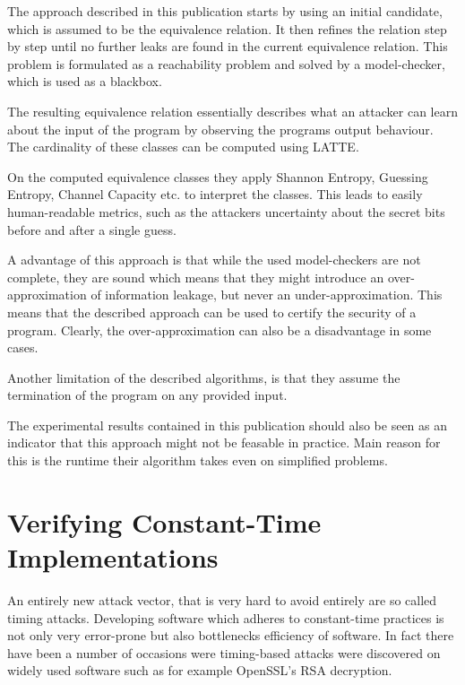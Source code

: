 \documentclass[a4paper,UKenglish]{lipics-v2018}
\begin{document}
The approach described in this publication starts by using an initial candidate, which is assumed to be the equivalence relation. It then refines the relation step by step until no further leaks are found in the current equivalence relation. This problem is formulated as a reachability problem and solved by a model-checker, which is used as a blackbox.\cite{automatic_discovery_and_quantification}

The resulting equivalence relation essentially describes what an attacker can learn about the input of the program by observing the programs output behaviour. The cardinality of these classes can be computed using LATTE.\cite{automatic_discovery_and_quantification}

On the computed equivalence classes they apply Shannon Entropy, Guessing Entropy, Channel Capacity etc. to interpret the classes. This leads to easily human-readable metrics, such as the attackers uncertainty about the secret bits before and after a single guess.\cite{automatic_discovery_and_quantification}

A advantage of this approach is that while the used model-checkers are not complete, they are sound which means that they might introduce an over-approximation of information leakage, but never an under-approximation. This means that the described approach can be used to certify the security of a program.\cite{automatic_discovery_and_quantification} Clearly, the over-approximation can also be a disadvantage in some cases. 

Another limitation of the described algorithms, is that they assume the termination of the program on any provided input.

The experimental results contained in this publication should also be seen as an indicator that this approach might not be feasable in practice. Main reason for this is the runtime their algorithm takes even on simplified problems.\cite{automatic_discovery_and_quantification}


\newpage
\section{Verifying Constant-Time Implementations}

An entirely new attack vector, that is very hard to avoid entirely are so called timing attacks. Developing software which adheres to constant-time practices is not only very error-prone but also bottlenecks efficiency of software. In fact there have been a number of occasions were timing-based attacks were discovered on widely used software such as for example OpenSSL's RSA decryption.
\end{document}
